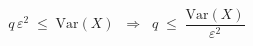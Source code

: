 \documentclass[preview]{standalone}
\begin{document}
\begin{align*}
q\,\varepsilon^2 \;\leq\; \mathrm{Var}(X) \;\;\Longrightarrow\;\; q \;\leq\; \dfrac{\mathrm{Var}(X)}{\varepsilon^2}
\end{align*}
\end{document}
